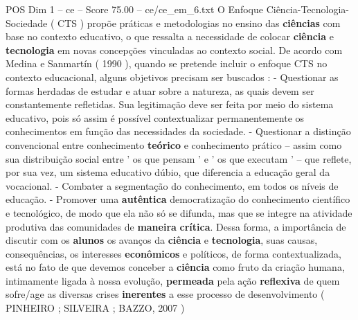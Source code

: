 \begin{textsample}{POS Dim 1 – ce – Score 75.00 – ce/ce\_em\_6.txt}
O Enfoque Ciência-Tecnologia-Sociedade ( CTS ) propõe práticas e metodologias no ensino das \textbf{ciências} com base no contexto educativo, o que ressalta a necessidade de colocar \textbf{ciência} e \textbf{tecnologia} em novas concepções vinculadas ao contexto social.
De acordo com Medina e Sanmartín ( 1990 ), quando se pretende incluir o enfoque CTS no contexto educacional, alguns objetivos precisam ser buscados : - Questionar as formas herdadas de estudar e atuar sobre a natureza, as quais devem ser constantemente refletidas.
Sua legitimação deve ser feita por meio do sistema educativo, pois só assim é possível contextualizar permanentemente os conhecimentos em função das necessidades da sociedade. - Questionar a distinção convencional entre conhecimento \textbf{teórico} e conhecimento prático – assim como sua distribuição social entre ' os que pensam ' e ' os que executam ' – que reflete, por sua vez, um sistema educativo dúbio, que diferencia a educação geral da vocacional. - Combater a segmentação do conhecimento, em todos os níveis de educação. - Promover uma \textbf{autêntica} democratização do conhecimento científico e tecnológico, de modo que ela não só se difunda, mas que se integre na atividade produtiva das comunidades de \textbf{maneira} \textbf{crítica}.
Dessa forma, a importância de discutir com os \textbf{alunos} os avanços da \textbf{ciência} e \textbf{tecnologia}, suas causas, consequências, os interesses \textbf{econômicos} e políticos, de forma contextualizada, está no fato de que devemos conceber a \textbf{ciência} como fruto da criação humana, intimamente ligada à nossa evolução, \textbf{permeada} pela ação \textbf{reflexiva} de quem sofre/age as diversas crises \textbf{inerentes} a esse processo de desenvolvimento ( PINHEIRO ; SILVEIRA ; BAZZO, 2007 )

\end{textsample}
